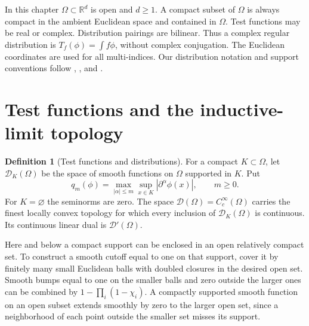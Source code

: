 \documentclass[11pt,oneside,openany]{book}
\theoremstyle{definition}
\newtheorem{definition}[theorem]{Definition}
\theoremstyle{remark}
\begin{document}
In this chapter \(\Omega\subset\mathbb R^d\) is open and \(d\geq1\). A compact subset of \(\Omega\) is always compact in the ambient Euclidean space and contained in \(\Omega\). Test functions may be real or complex. Distribution pairings are bilinear. Thus a complex regular distribution is \(T_f(\phi)=\int f\phi\), without complex conjugation. The Euclidean coordinates are used for all multi-indices. Our distribution notation and support conventions follow \cite[Chapter~10]{leoni}, \cite[Chapters~I--IV]{hormander}, and \cite[Chapter~6]{rudin}.

\section{Test functions and the inductive-limit topology}

\begin{definition}[Test functions and distributions]
\label{p102:AN-11-C01-R01}
For a compact \(K\subset\Omega\), let \(\mathcal D_K(\Omega)\) be the space of smooth functions on \(\Omega\) supported in \(K\). Put
\[
 q_m(\phi)=\max_{|\alpha|\leq m}\sup_{x\in K}|\partial^\alpha\phi(x)|,\qquad m\geq 0.
\]
For \(K=\varnothing\) the seminorms are zero. The space \(\mathcal D(\Omega)=C_c^\infty(\Omega)\) carries the finest locally convex topology for which every inclusion of \(\mathcal D_K(\Omega)\) is continuous. Its continuous linear dual is \(\mathcal D'(\Omega)\).
\end{definition}

Here and below a compact support can be enclosed in an open relatively compact set. To construct a smooth cutoff equal to one on that support, cover it by finitely many small Euclidean balls with doubled closures in the desired open set. Smooth bumps equal to one on the smaller balls and zero outside the larger ones can be combined by \(1-\prod_i(1-\chi_i)\). A compactly supported smooth function on an open subset extends smoothly by zero to the larger open set, since a neighborhood of each point outside the smaller set misses its support.
\end{document}
